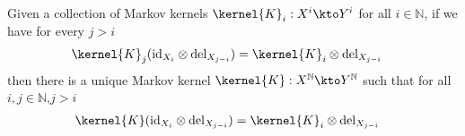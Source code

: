 









\begin{lemma}\label{lem:infinitely_extended_kernels}
Given a collection of Markov kernels $\kernel{K}_i:X^i\kto Y^i$ for all $i\in \mathbb{N}$, if we have for every $j>i$
\begin{align}
	\kernel{K}_j(\text{id}_{X_i}\otimes \text{del}_{X_{j-i}}) &= \kernel{K}_i\otimes \text{del}_{X_{j-i}}\label{eq:marginalise_comb}
\end{align} 
then there is a unique Markov kernel $\kernel{K}:X^{\mathbb{N}}\kto Y^{\mathbb{N}}$ such that for all $i,j\in \mathbb{N}$,$j>i$
\begin{align}
	\kernel{K}(\text{id}_{X_i}\otimes \text{del}_{X_{j-i}})&= \kernel{K}_i\otimes \text{del}_{X_{j-i}}
\end{align}
\end{lemma}

